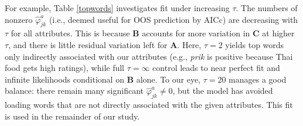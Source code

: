 \documentclass[12pt]{article}
\newcommand{\bm}[1]{\mathbf{#1}}
\begin{document}
For example, Table \ref{topwords} investigates fit under increasing $\tau$.
The numbers of nonzero $\hat\varphi^a_{jk}$  (i.e., deemed useful for OOS
prediction by AICc) are decreasing with $\tau$ for all attributes.  This is
because $\bm{B}$ accounts for more variation in $\bm{C}$ at higher $\tau$, and
there is little residual variation left for $\bm{A}$.    Here, $\tau=2$ yields
top words only indirectly associated with our attributes (e.g., {\it prik} is
positive because Thai food gets high ratings), while  full $\tau=\infty$
control leads to near perfect fit and infinite likelihoods conditional on
$\bm{B}$ alone. To our eye, $\tau=20$ manages a good balance: there remain
many significant $\hat\varphi^a_{jk}\neq 0$, but the model has avoided loading
words that are not directly associated with the given attributes.  This fit is
used in the remainder of our study.
\end{document}
